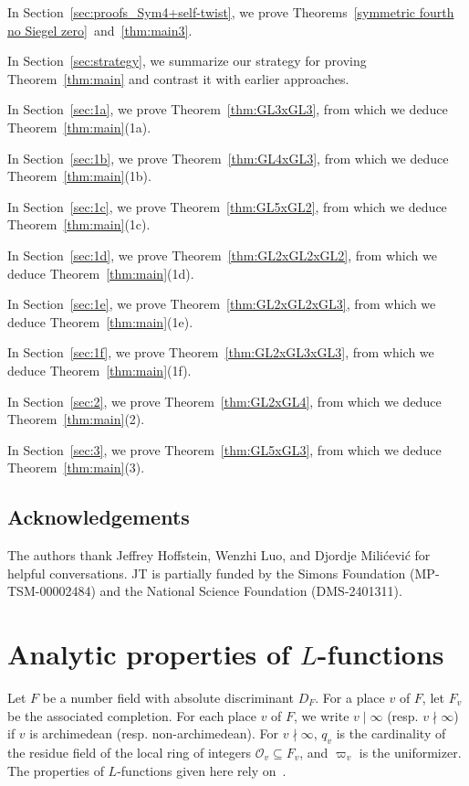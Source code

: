\documentclass[11pt]{amsart}
\theoremstyle{remark}
\numberwithin{equation}{section}
\begin{document}
In Section~\ref{sec:proofs_Sym4+self-twist}, we prove Theorems~\ref{symmetric fourth no Siegel zero}~and~\ref{thm:main3}.

In Section~\ref{sec:strategy}, we summarize our strategy for proving Theorem~\ref{thm:main} and contrast it with earlier approaches.

In Section~\ref{sec:1a}, we prove Theorem~\ref{thm:GL3xGL3}, from which we deduce Theorem~\ref{thm:main}(1a).

In Section~\ref{sec:1b}, we prove Theorem~\ref{thm:GL4xGL3}, from which we deduce Theorem~\ref{thm:main}(1b).

In Section~\ref{sec:1c}, we prove Theorem~\ref{thm:GL5xGL2}, from which we deduce Theorem~\ref{thm:main}(1c).

In Section~\ref{sec:1d}, we prove Theorem~\ref{thm:GL2xGL2xGL2}, from which we deduce Theorem~\ref{thm:main}(1d).

In Section~\ref{sec:1e}, we prove Theorem~\ref{thm:GL2xGL2xGL3}, from which we deduce Theorem~\ref{thm:main}(1e).

In Section~\ref{sec:1f}, we prove Theorem~\ref{thm:GL2xGL3xGL3}, from which we deduce Theorem~\ref{thm:main}(1f).

In Section~\ref{sec:2}, we prove Theorem~\ref{thm:GL2xGL4}, from which we deduce Theorem~\ref{thm:main}(2).

In Section~\ref{sec:3}, we prove Theorem~\ref{thm:GL5xGL3}, from which we deduce Theorem~\ref{thm:main}(3).

\subsection*{Acknowledgements}

The authors thank Jeffrey Hoffstein, Wenzhi Luo, and Djordje Mili{\'c}evi{\'c} for helpful conversations.  JT is partially funded by the Simons Foundation (MP-TSM-00002484) and the National Science Foundation (DMS-2401311).







\section{Analytic properties of $L$-functions}
\label{sec:Properties}

Let $F$ be a number field with absolute discriminant $D_F$.  For a place $v$ of $F$, let $F_v$ be the associated completion.  For each place $v$ of $F$, we write $v\mid\infty$ (resp. $v\nmid \infty$) if $v$ is archimedean (resp. non-archimedean).  For $v\nmid\infty$, $q_v$ is the cardinality of the residue field of the local ring of integers $\mathcal{O}_v\subseteq F_v$, and $\varpi_v$ is the uniformizer.  The properties of $L$-functions given here rely on~\cite{GodementJacquet,JPSS,MoeglinWaldspurger}.
\end{document}
